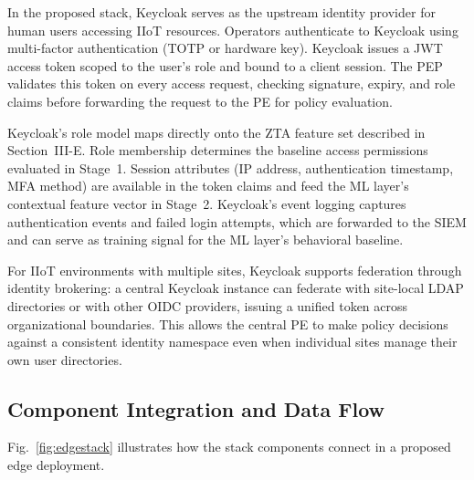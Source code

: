 \documentclass[conference]{IEEEtran}
\begin{document}
In the proposed stack, Keycloak serves as the upstream identity provider for human users accessing IIoT resources. Operators authenticate to Keycloak using multi-factor authentication (TOTP or hardware key). Keycloak issues a JWT access token scoped to the user's role and bound to a client session. The PEP validates this token on every access request, checking signature, expiry, and role claims before forwarding the request to the PE for policy evaluation.

Keycloak's role model maps directly onto the ZTA feature set described in Section~III-E. Role membership determines the baseline access permissions evaluated in Stage~1. Session attributes (IP address, authentication timestamp, MFA method) are available in the token claims and feed the ML layer's contextual feature vector in Stage~2. Keycloak's event logging captures authentication events and failed login attempts, which are forwarded to the SIEM and can serve as training signal for the ML layer's behavioral baseline.

For IIoT environments with multiple sites, Keycloak supports federation through identity brokering: a central Keycloak instance can federate with site-local LDAP directories or with other OIDC providers, issuing a unified token across organizational boundaries. This allows the central PE to make policy decisions against a consistent identity namespace even when individual sites manage their own user directories.

\subsection{Component Integration and Data Flow}

Fig.~\ref{fig:edgestack} illustrates how the stack components connect in a proposed edge deployment.
\end{document}
